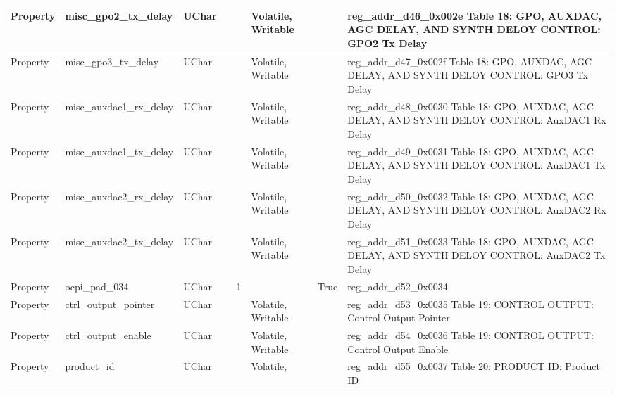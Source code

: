 \documentclass{article}
\begin{document}
\begin{scriptsize}
\begin{longtable}{|p{2cm}|p{5cm}|p{1cm}|p{2cm}|p{2cm}|p{1.75cm}|p{1.5cm}|p{5.1cm}|}
  \hline
  Property & misc\_gpo2\_tx\_delay                                    & UChar &                  &                  & Volatile,  Writable &         & reg\_addr\_d46\_0x002e  Table 18: GPO, AUXDAC, AGC DELAY, AND SYNTH DELOY CONTROL: GPO2 Tx Delay \\
  \hline
  Property & misc\_gpo3\_tx\_delay                                    & UChar &                  &                  & Volatile,  Writable &         & reg\_addr\_d47\_0x002f  Table 18: GPO, AUXDAC, AGC DELAY, AND SYNTH DELOY CONTROL: GPO3 Tx Delay \\
  \hline
  Property & misc\_auxdac1\_rx\_delay                                 & UChar &                  &                  & Volatile,  Writable &         & reg\_addr\_d48\_0x0030  Table 18: GPO, AUXDAC, AGC DELAY, AND SYNTH DELOY CONTROL: AuxDAC1 Rx Delay \\
  \hline
  Property & misc\_auxdac1\_tx\_delay                                 & UChar &                  &                  & Volatile,  Writable &         & reg\_addr\_d49\_0x0031  Table 18: GPO, AUXDAC, AGC DELAY, AND SYNTH DELOY CONTROL: AuxDAC1 Tx Delay \\
  \hline
  Property & misc\_auxdac2\_rx\_delay                                 & UChar &                  &                  & Volatile,  Writable &         & reg\_addr\_d50\_0x0032  Table 18: GPO, AUXDAC, AGC DELAY, AND SYNTH DELOY CONTROL: AuxDAC2 Rx Delay \\
  \hline
  Property & misc\_auxdac2\_tx\_delay                                 & UChar &                  &                  & Volatile,  Writable &         & reg\_addr\_d51\_0x0033  Table 18: GPO, AUXDAC, AGC DELAY, AND SYNTH DELOY CONTROL: AuxDAC2 Tx Delay \\
  \hline
  Property & ocpi\_pad\_034                                           & UChar &                  & 1                &                     & True    & reg\_addr\_d52\_0x0034 \\
  \hline
  Property & ctrl\_output\_pointer                                    & UChar &                  &                  & Volatile,  Writable &         & reg\_addr\_d53\_0x0035  Table 19: CONTROL OUTPUT: Control Output Pointer \\
  \hline
  Property & ctrl\_output\_enable                                     & UChar &                  &                  & Volatile,  Writable &         & reg\_addr\_d54\_0x0036  Table 19: CONTROL OUTPUT: Control Output Enable \\
  \hline
  Property & product\_id                                              & UChar &                  &                  & Volatile,           &         & reg\_addr\_d55\_0x0037  Table 20: PRODUCT ID: Product ID \\

\end{longtable}
\end{scriptsize}
\end{document}
